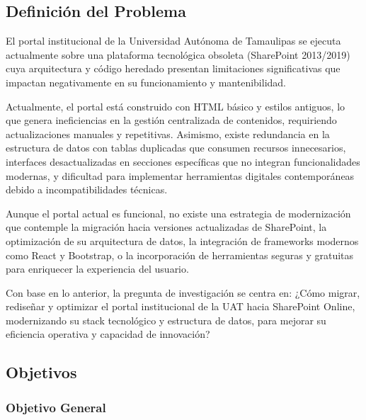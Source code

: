 \subsection{Definición del Problema}
\label{sec:problema}

El portal institucional de la Universidad Autónoma de Tamaulipas se ejecuta actualmente sobre una plataforma tecnológica obsoleta (SharePoint 2013/2019) cuya arquitectura y código heredado presentan limitaciones significativas que impactan negativamente en su funcionamiento y mantenibilidad.

Actualmente, el portal está construido con HTML básico y estilos antiguos, lo que genera ineficiencias en la gestión centralizada de contenidos, requiriendo actualizaciones manuales y repetitivas. Asimismo, existe redundancia en la estructura de datos con tablas duplicadas que consumen recursos innecesarios, interfaces desactualizadas en secciones específicas que no integran funcionalidades modernas, y dificultad para implementar herramientas digitales contemporáneas debido a incompatibilidades técnicas.

Aunque el portal actual es funcional, no existe una estrategia de modernización que contemple la migración hacia versiones actualizadas de SharePoint, la optimización de su arquitectura de datos, la integración de frameworks modernos como React y Bootstrap, o la incorporación de herramientas seguras y gratuitas para enriquecer la experiencia del usuario.

Con base en lo anterior, la pregunta de investigación se centra en: ¿Cómo migrar, rediseñar y optimizar el portal institucional de la UAT hacia SharePoint Online, modernizando su stack tecnológico y estructura de datos, para mejorar su eficiencia operativa y capacidad de innovación?

\subsection{Objetivos}
\label{sec:objetivos}


\subsubsection{Objetivo General}
\label{subsec:objetivo_general}

